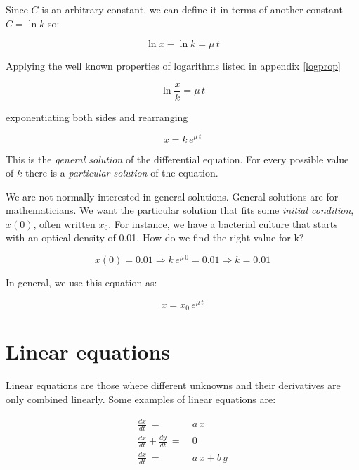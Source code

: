 \documentclass[12pt]{article}
\begin{document}
Since $C$ is an arbitrary constant, we can define it in terms of another constant $C= \ln{k}$ so:

\begin{equation}
	\ln{x} - \ln{k}  = \mu \, t 
\end{equation}

Applying the well known properties of logarithms listed in appendix \ref{logprop}

\begin{equation}
	\ln{\frac{x}{k}}   = \mu \, t 
\end{equation}

exponentiating both sides and rearranging

\begin{equation}
	x   = k \, e^{\mu \, t}
\end{equation}

This is the \emph{general solution} of the differential equation. For every possible value of $k$ there is a \emph{particular solution} of the equation.

We are not normally interested in general solutions. General solutions are for mathematicians. We want the particular solution that fits some \emph{initial condition}, $x(0)$, often written $x_0$. For instance, we have a bacterial culture that starts with an optical density of 0.01. How do we find the right value for k?


\begin{equation}
x(0) = 0.01 \Rightarrow	 k \, e^{\mu \, 0} = 0.01 \Rightarrow	k=0.01 
\end{equation}

In general, we use this equation as:

\begin{equation}
	x   = x_0 \, e^{\mu \, t}
\end{equation}

\section{Linear equations}

Linear equations are those where different unknowns and their derivatives are only combined linearly. Some examples of linear equations are:

\begin{align}
	\frac{dx}{dt} \: = \: &  a \, x	\\
	\frac{dx}{dt} + \frac{dy}{dt}\: = \: &  0 \\
	\frac{dx}{dt} \: = \: &  a \, x + b \, y
\end{align}
\end{document}
